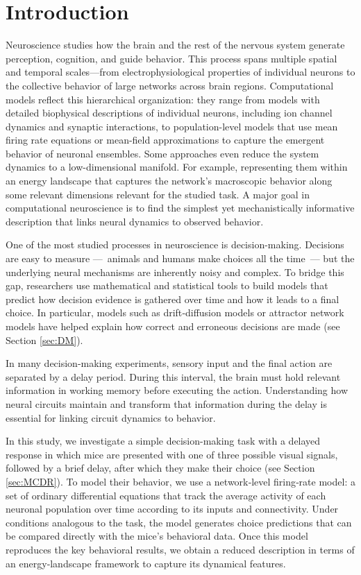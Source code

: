 \documentclass[../main.tex]{subfiles}
\begin{document}
\section{Introduction}
Neuroscience studies how the brain and the rest of the nervous system generate perception, cognition, and guide behavior. This process spans multiple spatial and temporal scales—from electrophysiological properties of individual neurons to the collective behavior of large networks across brain regions. Computational models reflect this hierarchical organization: they range from models with detailed biophysical descriptions of individual neurons,  including ion channel dynamics and synaptic interactions, to population-level models that use mean firing rate equations or mean-field approximations to capture the emergent behavior of neuronal ensembles. Some approaches even reduce the system dynamics to a low-dimensional manifold. For example, representing them within an energy landscape that captures the network’s macroscopic behavior along some relevant dimensions relevant for the studied task. A major goal in computational neuroscience is to find the simplest yet mechanistically informative description that links neural dynamics to observed behavior.


One of the most studied processes in neuroscience is decision-making. Decisions are easy to measure —~animals and humans make choices all the time~— but the underlying neural mechanisms are inherently noisy and complex. To bridge this gap, researchers use mathematical and statistical tools to build models that predict how decision evidence is gathered over time and how it leads to a final choice. In particular, models such as drift‐diffusion models \cite{ratcliff2016, hanks2017} or attractor network models have helped explain how correct and erroneous decisions are made \cite{hopfield1982} (see Section \ref{sec:DM}).

In many decision-making experiments, sensory input and the final action are separated by a delay period. During this interval, the brain must hold relevant information in working memory before executing the action. Understanding how neural circuits maintain and transform that information during the delay is essential for linking circuit dynamics to behavior.

In this study, we investigate a simple decision-making task with a delayed response in which mice are presented with one of three possible visual signals, followed by a brief delay, after which they make their choice (see Section \ref{sec:MCDR}). To model their behavior, we use a network‐level firing‐rate model: a set of ordinary differential equations that track the average activity of each neuronal population over time according to its inputs and connectivity. Under conditions analogous to the task, the model generates choice predictions that can be compared directly with the mice’s behavioral data. Once this model reproduces the key behavioral results, we obtain a reduced description in terms of an energy‐landscape framework to capture its dynamical features.
\end{document}
